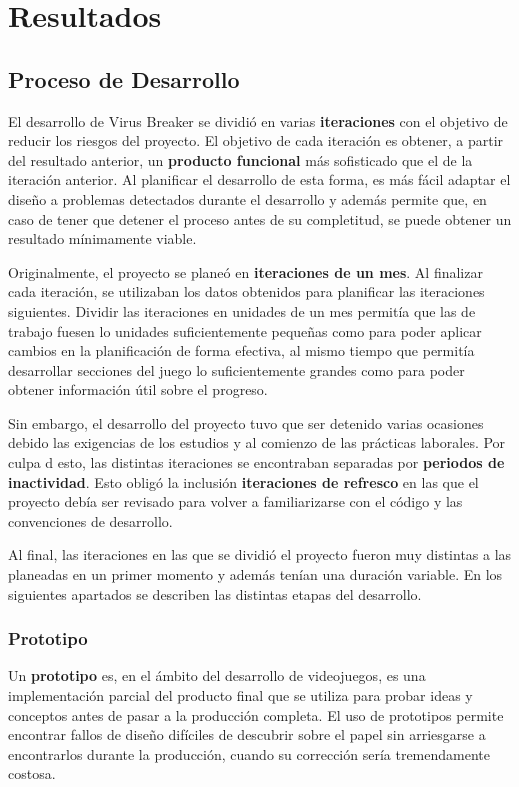 \chapter{Resultados}
\label{Resultados}
\section{Proceso de Desarrollo}
El desarrollo de Virus Breaker se dividió en varias \textbf{iteraciones} con el objetivo de reducir los riesgos del proyecto. El objetivo de cada iteración es obtener, a partir del resultado anterior, un \textbf{producto funcional} más sofisticado que el de la iteración anterior. Al planificar el desarrollo de esta forma, es más fácil adaptar el diseño a problemas detectados durante el desarrollo y además permite que, en caso de tener que detener el proceso antes de su completitud, se puede obtener un resultado mínimamente viable.

Originalmente, el proyecto se planeó en \textbf{iteraciones de un mes}. Al finalizar cada iteración, se utilizaban los datos obtenidos para planificar las iteraciones siguientes. Dividir las iteraciones en unidades de un mes permitía que las de trabajo fuesen lo unidades suficientemente pequeñas como para poder aplicar cambios en la planificación de forma efectiva, al mismo tiempo que permitía desarrollar secciones del juego lo suficientemente grandes como para poder obtener información útil sobre el progreso. 

Sin embargo, el desarrollo del proyecto tuvo que ser detenido varias ocasiones debido las exigencias de los estudios y al comienzo de las prácticas laborales. Por culpa d esto, las distintas iteraciones se encontraban separadas por \textbf{periodos de inactividad}. Esto obligó la inclusión \textbf{iteraciones de refresco} en las que el proyecto debía ser revisado para volver a familiarizarse con el código y las convenciones de desarrollo. 

Al final, las iteraciones en las que se dividió el proyecto fueron muy distintas a las planeadas en un primer momento y además tenían una duración variable. En los siguientes apartados se describen las distintas etapas del desarrollo.

\subsection{Prototipo}
Un \textbf{prototipo} es, en el ámbito del desarrollo de videojuegos, es una implementación parcial del producto final que se utiliza para probar ideas y conceptos antes de pasar a la producción completa. El uso de prototipos permite encontrar fallos de diseño difíciles de descubrir sobre el papel sin arriesgarse a encontrarlos durante la producción, cuando su corrección sería tremendamente costosa. 

